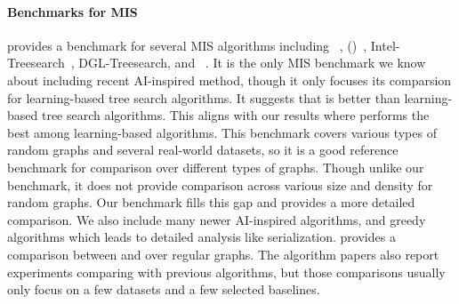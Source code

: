 \paragraph{Benchmarks for MIS}
\citet{boether_dltreesearch_2022} provides a benchmark for several MIS algorithms including \gurobi~\citep{gurobi}, \kamis (\redumis)~\citep{lamm2017finding}, Intel-Treesearch~\citep{li2018combinatorial}, DGL-Treesearch, and \lwd~\cite{ahn2020learning}. It is the only MIS benchmark we know about including recent AI-inspired method, though it only focuses its comparsion for learning-based tree search algorithms. It suggests that \lwd is better than learning-based tree search algorithms. This aligns with our results where \lwd performs the best among learning-based algorithms. This benchmark covers various types of random graphs and several real-world datasets, so it is a good reference benchmark for comparison over different types of graphs. Though unlike our benchmark, it does not provide comparison across various size and density for random graphs. Our benchmark fills this gap and provides a more detailed comparison. We also include many newer AI-inspired algorithms, and greedy algorithms which leads to detailed analysis like serialization.
\citet{angelini2023modern} provides a comparison between \citet{schuetz2022combinatorial} and \deggreedy over regular graphs. The algorithm papers also report experiments comparing with previous algorithms, but those comparisons usually only focus on a few datasets and a few selected baselines.

